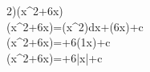 2)\int\left(x^2+\dfrac6x\right)
\\\int\left(x^2+\dfrac6x\right)=\int\left(x^2\right)dx+\int\left(\dfrac6x\right)+c
\\\int\left(x^2+\dfrac6x\right)=+6\int\left(\dfrac1x\right)+c
\\\int\left(x^2+\dfrac6x\right)=+6\ln|x|+c